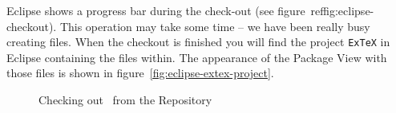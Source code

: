 Eclipse shows a progress bar during the check-out (see
figure~ref{fig:eclipse-checkout}). This operation may take some time
-- we have been really busy creating files. When the checkout is
finished you will find the project \texttt{ExTeX} in Eclipse
containing the files within. The appearance of the Package View with
those files is shown in figure~\ref{fig:eclipse-extex-project}.
\begin{figure}[htp]
  \hbox{}\hfill
  \hfill
  \caption{Checking out \ExTeX\ from the Repository}
\end{figure}

